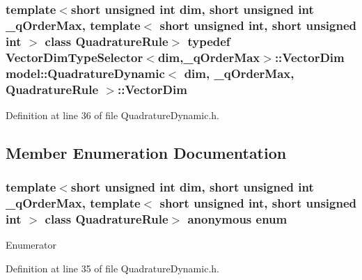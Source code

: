 \subsubsection[{Vector\+Dim}]{\setlength{\rightskip}{0pt plus 5cm}template$<$short unsigned int dim, short unsigned int \+\_\+q\+Order\+Max, template$<$ short unsigned int, short unsigned int $>$ class Quadrature\+Rule$>$ typedef {\bf Vector\+Dim\+Type\+Selector}$<${\bf dim},\+\_\+q\+Order\+Max$>$\+::{\bf Vector\+Dim} {\bf model\+::\+Quadrature\+Dynamic}$<$ {\bf dim}, \+\_\+q\+Order\+Max, Quadrature\+Rule $>$\+::{\bf Vector\+Dim}}\label{structmodel_1_1_quadrature_dynamic_a938d089d4cea5e1029076fbf5801521a}


Definition at line 36 of file Quadrature\+Dynamic.\+h.



\subsection{Member Enumeration Documentation}
\hypertarget{structmodel_1_1_quadrature_dynamic_aaaf0950f2021c9e6d098553f3f95e1b2}{}\subsubsection[{anonymous enum}]{\setlength{\rightskip}{0pt plus 5cm}template$<$short unsigned int dim, short unsigned int \+\_\+q\+Order\+Max, template$<$ short unsigned int, short unsigned int $>$ class Quadrature\+Rule$>$ anonymous enum}\label{structmodel_1_1_quadrature_dynamic_aaaf0950f2021c9e6d098553f3f95e1b2}
\begin{Desc}
\item[Enumerator]\par
\begin{description}
\item[{\em 
\hypertarget{structmodel_1_1_quadrature_dynamic_aaaf0950f2021c9e6d098553f3f95e1b2a3127c89404e35183c741a4eb20176be9}{}q\+Order\+Max\label{structmodel_1_1_quadrature_dynamic_aaaf0950f2021c9e6d098553f3f95e1b2a3127c89404e35183c741a4eb20176be9}
}]\end{description}
\end{Desc}


Definition at line 35 of file Quadrature\+Dynamic.\+h.



